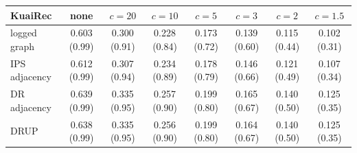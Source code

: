 \begin{tabular}{lccccccc}
\toprule
KuaiRec & none & $c=20$ & $c=10$ & $c=5$ & $c=3$ & $c=2$ & $c=1.5$\\
\midrule
logged graph & 0.603 (0.99) & 0.300 (0.91) & 0.228 (0.84) & 0.173 (0.72) & 0.139 (0.60) & 0.115 (0.44) & 0.102 (0.31)\\
IPS adjacency & 0.612 (0.99) & 0.307 (0.94) & 0.234 (0.89) & 0.178 (0.79) & 0.146 (0.66) & 0.121 (0.49) & 0.107 (0.34)\\
DR adjacency & 0.639 (0.99) & 0.335 (0.95) & 0.257 (0.90) & 0.199 (0.80) & 0.165 (0.67) & 0.140 (0.50) & 0.125 (0.35)\\
DRUP & 0.638 (0.99) & 0.335 (0.95) & 0.256 (0.90) & 0.199 (0.80) & 0.164 (0.67) & 0.140 (0.50) & 0.125 (0.35)\\
\bottomrule
\end{tabular}

